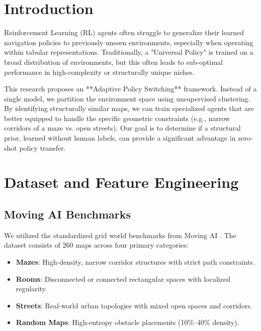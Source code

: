 \documentclass[12pt,a4paper]{article}
\begin{document}
\section{Introduction}

Reinforcement Learning (RL) agents often struggle to generalize their learned navigation policies to previously unseen environments, especially when operating within tabular representations. Traditionally, a "Universal Policy" is trained on a broad distribution of environments, but this often leads to sub-optimal performance in high-complexity or structurally unique niches.

This research proposes an **Adaptive Policy Switching** framework. Instead of a single model, we partition the environment space using unsupervised clustering. By identifying structurally similar maps, we can train specialized agents that are better equipped to handle the specific geometric constraints (e.g., narrow corridors of a maze vs. open streets). Our goal is to determine if a structural prior, learned without human labels, can provide a significant advantage in zero-shot policy transfer.

\section{Dataset and Feature Engineering}

\subsection{Moving AI Benchmarks}
We utilized the standardized grid world benchmarks from Moving AI \cite{movingai}. The dataset consists of 260 maps across four primary categories:
\begin{itemize}
    \item \textbf{Mazes}: High-density, narrow corridor structures with strict path constraints.
    \item \textbf{Rooms}: Disconnected or connected rectangular spaces with localized regularity.
    \item \textbf{Streets}: Real-world urban topologies with mixed open spaces and corridors.
    \item \textbf{Random Maps}: High-entropy obstacle placements (10\%--40\% density).
\end{itemize}
\end{document}
